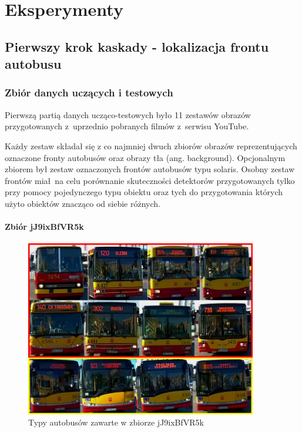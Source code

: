 \chapter{Eksperymenty}

\section{Pierwszy krok kaskady - lokalizacja frontu autobusu}

\subsection{Zbiór danych uczących i testowych}

Pierwszą partią danych ucząco-testowych było 11 zestawów obrazów
przygotowanych z~uprzednio pobranych filmów z~serwisu YouTube.

Każdy zestaw składał się z co najmniej dwuch zbiorów obrazów 
reprezentujących oznaczone fronty autobusów oraz obrazy tła
(ang. background). Opcjonalnym zbiorem był zestaw oznaczonych 
frontów autobusów typu solaris. Osobny zestaw frontów miał na celu
porównanie skuteczności detektorów przygotowanych tylko przy pomocy
pojedynczego typu obiektu oraz tych do przygotowania których użyto
obiektów znacząco od siebie różnych.

\subsubsection{Zbiór jJ9ixBfVR5k}

\begin{figure}[!h]
    \centering
    \includegraphics[width=0.9\textwidth]{img/exp_trainig_data_jJ9}
    \caption{Typy autobusów zawarte w zbiorze jJ9ixBfVR5k}
    \label{fig:jJ9ixBfVR5k_types}
\end{figure}

